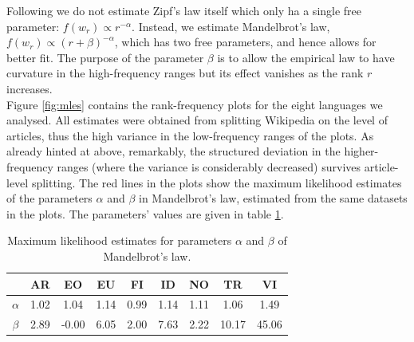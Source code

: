 \documentclass{article}
\begin{document}
Following \parencite{piantadosi2014zipf} we do not estimate Zipf's law itself which only ha a single free parameter: $f(w_r) \propto r^{-\alpha}$. Instead, we estimate Mandelbrot's law, $f(w_r) \propto (r + \beta)^{-\alpha}$, which has two free parameters, and hence allows for better fit. The purpose of the parameter $\beta$ is to allow the empirical law to have curvature in the high-frequency ranges but its effect vanishes as the rank $r$ increases.\\

Figure \ref{fig:mles} contains the rank-frequency plots for the eight languages we analysed. All estimates were obtained from splitting Wikipedia on the level of articles, thus the high variance in the low-frequency ranges of the plots. As already hinted at above, remarkably, the structured deviation in the higher-frequency ranges (where the variance is considerably decreased) survives article-level splitting. The red lines in the plots show the maximum likelihood estimates of the parameters $\alpha$ and $\beta$ in Mandelbrot's law, estimated from the same datasets in the plots. The parameters' values are given in table \ref{params}. 


\begin{table}[ht]
\centering
\begin{tabular}{c|c c c c c c c c }
	& AR & EO & EU & FI & ID & NO & TR & VI\\\hline
	$\alpha$ & 1.02 & 1.04 & 1.14 & 0.99 & 1.14 & 1.11 & 1.06 & 1.49  \\
	$\beta$ &  2.89 & -0.00 & 6.05 & 2.00 & 7.63 & 2.22 & 10.17 & 45.06  \\
\end{tabular}
	\caption{Maximum likelihood estimates for parameters $\alpha$ and $\beta$ of Mandelbrot's law.}
	\label{params}
\end{table}
\end{document}
